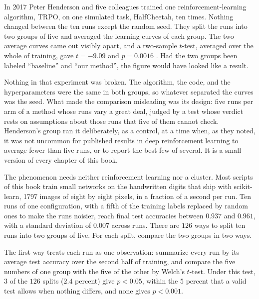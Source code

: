 \label{ch:prologue}
\begin{refsection}

In 2017 Peter Henderson and five colleagues trained one reinforcement-learning algorithm, TRPO, on one simulated task, HalfCheetah, ten times. Nothing changed between the ten runs except the random seed. They split the runs into two groups of five and averaged the learning curves of each group. The two average curves came out visibly apart, and a two-sample $t$-test, averaged over the whole of training, gave $t=-9.09$ and $p=0.0016$ \parencite{HendersonEtAl2018}. Had the two groups been labeled ``baseline'' and ``our method'', the figure would have looked like a result.

Nothing in that experiment was broken. The algorithm, the code, and the hyperparameters were the same in both groups, so whatever separated the curves was the seed. What made the comparison misleading was its design: five runs per arm of a method whose runs vary a great deal, judged by a test whose verdict rests on assumptions about those runs that five of them cannot check. Henderson's group ran it deliberately, as a control, at a time when, as they noted, it was not uncommon for published results in deep reinforcement learning to average fewer than five runs, or to report the best few of several. It is a small version of every chapter of this book.


The phenomenon needs neither reinforcement learning nor a cluster. Most scripts of this book train small networks on the handwritten digits that ship with scikit-learn, 1797 images of eight by eight pixels, in a fraction of a second per run. Ten runs of one configuration, with a fifth of the training labels replaced by random ones to make the runs noisier, reach final test accuracies between $0.937$ and $0.961$, with a standard deviation of $0.007$ across runs. There are $126$ ways to split ten runs into two groups of five. For each split, compare the two groups in two ways.

The first way treats each run as one observation: summarize every run by its average test accuracy over the second half of training, and compare the five numbers of one group with the five of the other by Welch's $t$-test. Under this test, $3$ of the $126$ splits ($2.4$ percent) give $p<0.05$, within the $5$ percent that a valid test allows when nothing differs, and none gives $p<0.001$.


\end{refsection}
